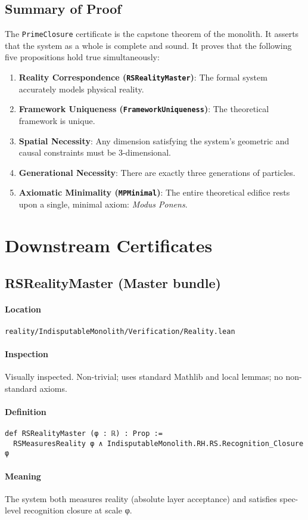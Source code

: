 \documentclass{article}
\newcommand{\FileRef}[1]{\texttt{#1}}
\newcommand{\ModuleHeader}[3]{%
  \subsection{#1}
  \paragraph{Location} \FileRef{#2}\\
  \paragraph{Inspection} #3
}
\begin{document}
\subsection{Summary of Proof}
The \texttt{PrimeClosure} certificate is the capstone theorem of the monolith. It asserts that the system as a whole is complete and sound. It proves that the following five propositions hold true simultaneously:
\begin{enumerate}
    \item \textbf{Reality Correspondence (\texttt{RSRealityMaster})}: The formal system accurately models physical reality.
    \item \textbf{Framework Uniqueness (\texttt{FrameworkUniqueness})}: The theoretical framework is unique.
    \item \textbf{Spatial Necessity}: Any dimension satisfying the system's geometric and causal constraints must be 3-dimensional.
    \item \textbf{Generational Necessity}: There are exactly three generations of particles.
    \item \textbf{Axiomatic Minimality (\texttt{MPMinimal})}: The entire theoretical edifice rests upon a single, minimal axiom: \textit{Modus Ponens}.
\end{enumerate}

\section{Downstream Certificates}

\ModuleHeader{RSRealityMaster (Master bundle)}{reality/IndisputableMonolith/Verification/Reality.lean}{Visually inspected. Non-trivial; uses standard Mathlib and local lemmas; no non-standard axioms.}
\paragraph{Definition}
\begin{lstlisting}
def RSRealityMaster (φ : ℝ) : Prop :=
  RSMeasuresReality φ ∧ IndisputableMonolith.RH.RS.Recognition_Closure φ
\end{lstlisting}
\paragraph{Meaning} The system both measures reality (absolute layer acceptance) and satisfies spec-level recognition closure at scale φ.

\end{document}
